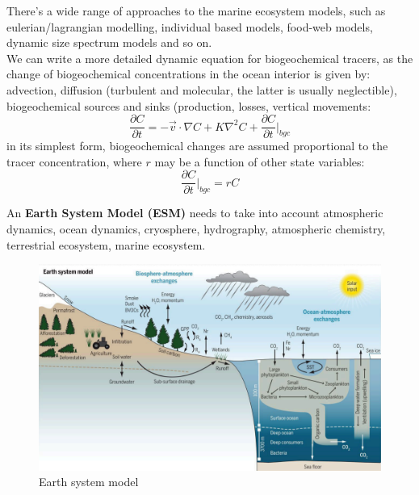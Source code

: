 There's a wide range of approaches to the marine ecosystem models, such as eulerian/lagrangian modelling, individual based models, food-web models, dynamic size spectrum models and so on. \\

We can write a more detailed dynamic equation for biogeochemical tracers, as the change of biogeochemical concentrations in the ocean interior is given by: advection, diffusion (turbulent and molecular, the latter is usually neglectible), biogeochemical sources and sinks (production, losses, vertical movements:
\begin{equation}
	\frac{\partial C}{\partial t}=-\vec{v}\cdot\nabla C+K\nabla^2 C+\frac{\partial C}{\partial t}\big|_{bgc}
\end{equation}
in its simplest form, biogeochemical changes are assumed proportional to the tracer concentration, where $r$ may be a function of other state variables:
$$\frac{\partial C}{\partial t}\big|_{bgc} =rC$$


An \textbf{Earth System Model (ESM)} needs to take into account atmospheric dynamics, ocean dynamics, cryosphere, hydrography, atmospheric chemistry, terrestrial ecosystem, marine ecosystem.
\begin{figure}[htpb]
	\centering
	\includegraphics[width=0.5\linewidth]{uploads/Earth system model.png}
	\caption{Earth system model}

\end{figure}

